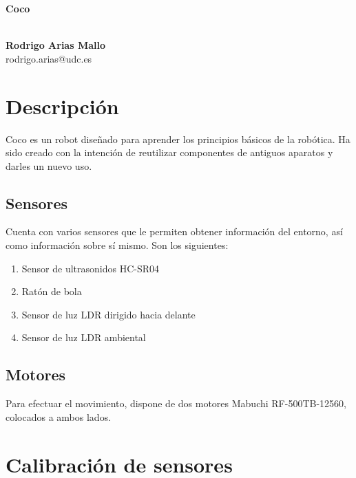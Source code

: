 \documentclass[10pt,a4paper,hidelinks]{article}
\begin{document}
\begin{center}
\begin{huge}
\textbf{Coco}
\end{huge}
\\[10pt]
\textbf{Rodrigo Arias Mallo}\\
rodrigo.arias@udc.es
\end{center}

\newcommand\RobotAngle{45}
\newcommand\RobotSize{2}
\newcommand\RobotRadius{4}
\newcommand\RobotThetaSonar{60.0}

\begin{multicols}{2}

\section{Descripción}
Coco es un robot diseñado para aprender los principios básicos de la robótica.
Ha sido creado con la intención de reutilizar componentes de antiguos aparatos y 
darles un nuevo uso.

\subsection{Sensores}
Cuenta con varios sensores que le permiten obtener información del entorno, así
como información sobre sí mismo. Son los siguientes:

\begin{enumerate}
	\setlength{\parskip}{0cm}

	\item Sensor de ultrasonidos HC-SR04
	\item Ratón de bola
	\item Sensor de luz LDR dirigido hacia delante
	\item Sensor de luz LDR ambiental
\end{enumerate}

\subsection{Motores}
Para efectuar el movimiento, dispone de dos motores Mabuchi RF-500TB-12560, colocados
a ambos lados.


\section{Calibración de sensores}

\end{multicols}
\end{document}
